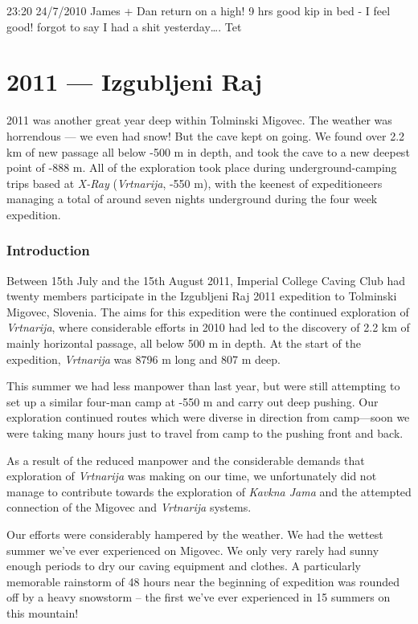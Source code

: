 23:20 24/7/2010 James + Dan return on a high! 9 hrs good kip in bed - I
feel good! forgot to say I had a shit yesterday\ldots{}. Tet

\hypertarget{izgubljeni-raj}{%
\chapter{2011 --- Izgubljeni Raj}\label{izgubljeni-raj}}

2011 was another great year deep within Tolminski Migovec. The weather
was horrendous --- we even had snow! But the cave kept on going. We
found over 2.2 km of new passage all below -500 m in depth, and took the
cave to a new deepest point of -888 m. All of the exploration took place
during underground-camping trips based at \emph{X-Ray}
(\emph{Vrtnarija}, -550 m), with the keenest of expeditioneers managing
a total of around seven nights underground during the four week
expedition.

\hypertarget{introduction-2}{%
\subsection{Introduction}\label{introduction-2}}

Between 15th July and the 15th August 2011, Imperial College Caving Club
had twenty members participate in the Izgubljeni Raj 2011 expedition to
Tolminski Migovec, Slovenia. The aims for this expedition were the
continued exploration of \emph{Vrtnarija}, where considerable efforts in
2010 had led to the discovery of 2.2 km of mainly horizontal passage,
all below 500 m in depth. At the start of the expedition,
\emph{Vrtnarija} was 8796 m long and 807 m deep.

This summer we had less manpower than last year, but were still
attempting to set up a similar four-man camp at -550 m and carry out
deep pushing. Our exploration continued routes which were diverse in
direction from camp---soon we were taking many hours just to travel from
camp to the pushing front and back.

As a result of the reduced manpower and the considerable demands that
exploration of \emph{Vrtnarija} was making on our time, we unfortunately
did not manage to contribute towards the exploration of \emph{Kavkna
Jama} and the attempted connection of the Migovec and \emph{Vrtnarija}
systems.

Our efforts were considerably hampered by the weather. We had the
wettest summer we've ever experienced on Migovec. We only very rarely
had sunny enough periods to dry our caving equipment and clothes. A
particularly memorable rainstorm of 48 hours near the beginning of
expedition was rounded off by a heavy snowstorm -- the first we've ever
experienced in 15 summers on this mountain!

